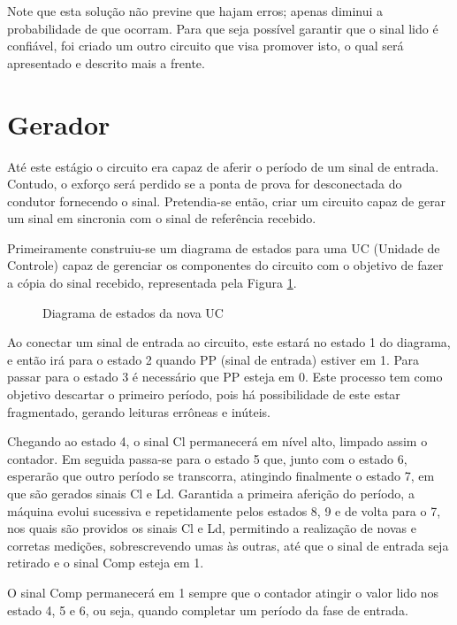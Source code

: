\documentclass[12pt,a4paper,openany]{abntex2}
\begin{document}
Note que esta solução não previne que hajam erros; apenas diminui a probabilidade de que ocorram. Para que seja possível garantir que o sinal lido é confiável, foi criado um outro circuito que visa promover isto, o qual será apresentado e descrito mais a frente.

\section{Gerador}

Até este estágio o circuito era  capaz de aferir o período de um sinal de entrada. Contudo, o exforço será perdido se a ponta de prova for desconectada do condutor fornecendo o sinal. Pretendia-se então, criar um circuito capaz de gerar um sinal em sincronia com o sinal de referência recebido. 

Primeiramente construiu-se um diagrama de estados para uma UC (Unidade de Controle) capaz de gerenciar os componentes do circuito com o objetivo de fazer a cópia do sinal recebido, representada pela Figura \ref{fig:diagrama-de-estado1}.

\begin{figure}[!htp]
	\centering
	\caption{Diagrama de estados da nova UC}
	\label{fig:diagrama-de-estado1}
\end{figure}

Ao conectar um sinal de entrada ao circuito, este estará no estado 1 do diagrama, e então irá para o estado 2 quando PP (sinal de entrada) estiver em 1. Para passar para o estado 3 é necessário que PP esteja em 0. Este processo tem como objetivo descartar o primeiro período, pois há possibilidade de este estar fragmentado, gerando leituras errôneas e inúteis.

Chegando ao estado 4, o sinal Cl permanecerá em nível alto, limpado assim o contador. Em seguida passa-se para o estado 5 que, junto com o estado 6, esperarão que outro período se transcorra, atingindo finalmente o estado 7, em que são gerados sinais Cl e Ld. Garantida a primeira aferição do período, a máquina evolui sucessiva e repetidamente pelos estados 8, 9 e de volta para o 7, nos quais são providos os sinais Cl e Ld, permitindo a realização de novas e corretas medições, sobrescrevendo umas às outras, até que o sinal de entrada seja retirado e o sinal Comp esteja em 1.

O sinal Comp permanecerá em 1 sempre que o contador atingir o valor lido nos estado 4, 5 e 6, ou seja, quando completar um período da fase de entrada.
\end{document}
